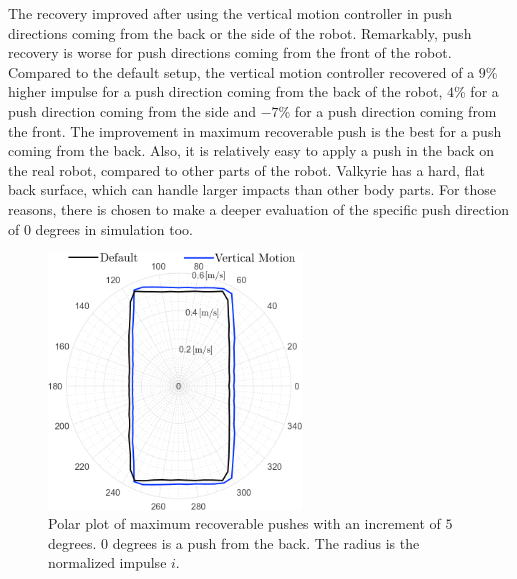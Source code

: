The recovery improved after using the vertical motion controller in push directions coming from the back or the side of the robot. Remarkably, push recovery is worse for push directions coming from the front of the robot. Compared to the default setup, the vertical motion controller recovered of a $9$\% higher impulse for a push direction coming from the back of the robot, $4$\% for a push direction coming from the side and $-7$\% for a push direction coming from the front. The improvement in maximum recoverable push is the best for a push coming from the back. Also, it is relatively easy to apply a push in the back on the real robot, compared to other parts of the robot. Valkyrie has a hard, flat back surface, which can handle larger impacts than other body parts. For those reasons, there is chosen to make a deeper evaluation of the specific push direction of $0$ degrees in simulation too.
\begin{figure}
\centering
\includegraphics[width=0.6\textwidth]{STYLESTUFF/roundStanding.png}
\caption{Polar plot of maximum recoverable pushes with an increment of $5$ degrees. $0$ degrees is a push from the back. The radius is the normalized impulse $i$. }
\label{fig:roundStanding}
\end{figure}


